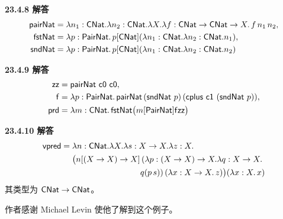 \begin{taplauthorsolutionentrybox}
\label{sol:author:23.4.8}
\textbf{23.4.8 解答}
\[
\begin{aligned}
\mathsf{pairNat}
 &=\lambda n_1:\mathsf{CNat}.\lambda n_2:\mathsf{CNat}.
   \lambda X.\lambda f:\mathsf{CNat}\to\mathsf{CNat}\to X.\,
   f\,n_1\,n_2,\\
\mathsf{fstNat}
 &=\lambda p:\mathsf{PairNat}.\,
   p[\mathsf{CNat}]
   (\lambda n_1:\mathsf{CNat}.\lambda n_2:\mathsf{CNat}.n_1),\\
\mathsf{sndNat}
 &=\lambda p:\mathsf{PairNat}.\,
   p[\mathsf{CNat}]
   (\lambda n_1:\mathsf{CNat}.\lambda n_2:\mathsf{CNat}.n_2)
\end{aligned}
\]
\end{taplauthorsolutionentrybox}

\begin{taplauthorsolutionentrybox}
\label{sol:author:23.4.9}
\textbf{23.4.9 解答}
\[
\begin{aligned}
\mathsf{zz}&=\mathsf{pairNat}\ \mathsf{c0}\ \mathsf{c0},\\
\mathsf{f}&=\lambda p:\mathsf{PairNat}.\,
 \mathsf{pairNat}\,
 (\mathsf{sndNat}\ p)\,
 (\mathsf{cplus}\ \mathsf{c1}\ (\mathsf{sndNat}\ p)),\\
\mathsf{prd}&=\lambda m:\mathsf{CNat}.\,
 \mathsf{fstNat}\bigl(m[\mathsf{PairNat}]\mathsf{f}\mathsf{zz}\bigr)
\end{aligned}
\]
\end{taplauthorsolutionentrybox}

\begin{taplauthorsolutionentrybox}
\label{sol:author:23.4.10}
\textbf{23.4.10 解答}
\[
\begin{aligned}
\taplterm{vpred}={}&\lambda n:\tapltype{CNat}.\lambda X.\lambda s:X\to X.
\lambda z:X.\\
&\bigl(n[(X\to X)\to X]\,
  (\lambda p:(X\to X)\to X.\lambda q:X\to X.\\
&\hspace{29mm}q(p\,s))\,
  (\lambda x:X\to X.\,z)\bigr)(\lambda x:X.\,x)
\end{aligned}
\]
其类型为 \(\mathsf{CNat}\to\mathsf{CNat}\)。

作者感谢 Michael Levin 使他了解到这个例子。
\end{taplauthorsolutionentrybox}

